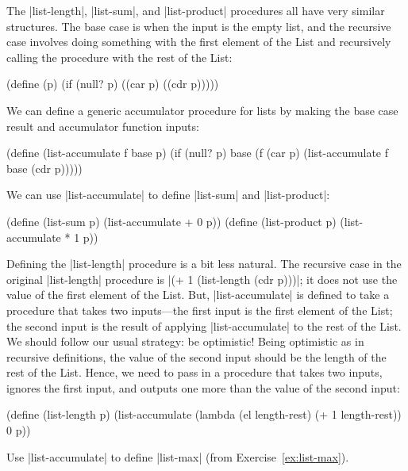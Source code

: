 \begin{schemeregion}
The \scheme|list-length|, \scheme|list-sum|, and \scheme|list-product| procedures all have very similar structures.  The base case is when the input is the empty list, and the recursive case involves doing something with the first element of the List and recursively calling the procedure with the rest of the List:

\begin{schemedisplay}
(define (\recproc p)
   (if (null? p)
       \basecaseres
       (\accumfunc (car p) (\recproc (cdr p)))))
\end{schemedisplay}

We can define a generic accumulator procedure for lists by making the base case result and accumulator function inputs:
\begin{schemedisplay}
(define (list-accumulate f base p)
  (if (null? p) 
      base
      (f (car p) (list-accumulate f base (cdr p)))))
\end{schemedisplay}

We can use \scheme|list-accumulate| to define \scheme|list-sum| and \scheme|list-product|:
\begin{schemedisplay}
(define (list-sum p) (list-accumulate + 0 p))
(define (list-product p) (list-accumulate * 1 p))
\end{schemedisplay}

Defining the \scheme|list-length| procedure is a bit less natural.  The recursive case in the original \scheme|list-length| procedure is \scheme|(+ 1 (list-length (cdr p)))|; it does not use the value of the first element of the List.  But, \scheme|list-accumulate| is defined to take a procedure that takes two inputs---the first input is the first element of the List; the second input is the result of applying \scheme|list-accumulate| to the rest of the List.  We should follow our usual strategy: be optimistic!  Being optimistic as in recursive definitions, the value of the second input should be the length of the rest of the List.  Hence, we need to pass in a procedure that takes two inputs, ignores the first input, and outputs one more than the value of the second input:
\begin{schemedisplay}
(define (list-length p) 
  (list-accumulate (lambda (el length-rest) (+ 1 length-rest)) 0 p))
\end{schemedisplay}

\beforeex
\begin{exercise}
Use \scheme|list-accumulate| to define \scheme|list-max| (from Exercise~\ref{ex:list-max}).
\solution{\LATER{}}
\end{exercise}
\afterex


\end{schemeregion}
